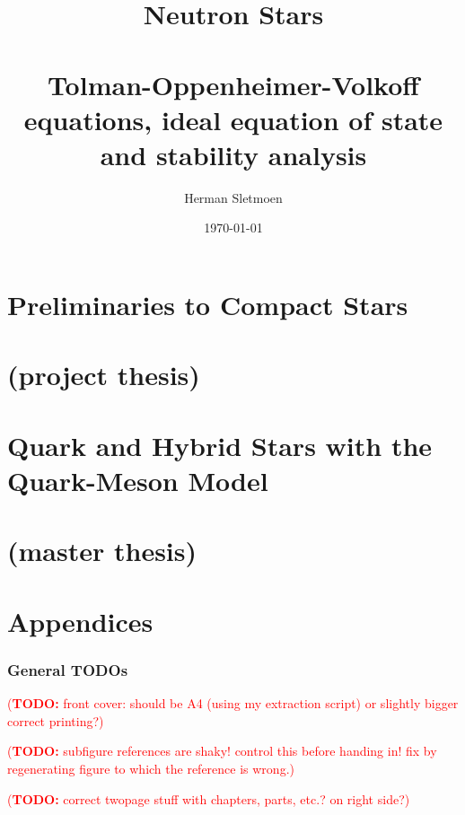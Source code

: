\documentclass[a4paper,11pt,twoside,openany]{book}
\title{%
	Neutron Stars \\ \ \\
	\normalsize Tolman-Oppenheimer-Volkoff equations, ideal equation of state and stability analysis
}
\author{Herman Sletmoen}
\date{\today}
\newcommand\TODO[1]{\textcolor{red}{(\textbf{TODO:} #1)}}
\newcommand{\1}{\mathds{1}}
\begin{document}
\frontmatter
\begin{titlepage}
\end{titlepage}



\tableofcontents


\mainmatter
\part[Preliminaries to Compact Stars (project thesis)]%
{Preliminaries to Compact Stars \\ \ \\ (project thesis)} \label{part:project}





\part[Quark and Hybrid Stars with the Quark-Meson Model (master thesis)]%
{Quark and Hybrid Stars with the Quark-Meson Model \\ \ \\ (master thesis)} \label{part:master}






\part{Appendices} \label{part:appendices}


\backmatter
\printbibliography[heading=bibintoc, title={References}]

\pagebreak
\section*{General TODOs}

\TODO{front cover: should be A4 (using my extraction script) or slightly bigger correct printing?}

\TODO{subfigure references are shaky! control this before handing in! fix by regenerating figure to which the reference is wrong.}

\TODO{correct twopage stuff with chapters, parts, etc.? on right side?}

\cleartoevenpage %

\end{document}
